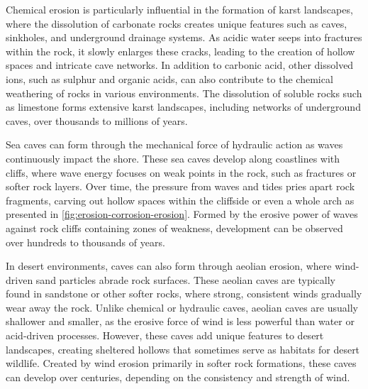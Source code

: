 Chemical erosion is particularly influential in the formation of karst landscapes, where the dissolution of carbonate rocks creates unique features such as caves, sinkholes, and underground drainage systems. As acidic water seeps into fractures within the rock, it slowly enlarges these cracks, leading to the creation of hollow spaces and intricate cave networks. In addition to carbonic acid, other dissolved ions, such as sulphur and organic acids, can also contribute to the chemical weathering of rocks in various environments. The dissolution of soluble rocks such as limestone forms extensive karst landscapes, including networks of underground caves, over thousands to millions of years.

Sea caves can form through the mechanical force of hydraulic action as waves continuously impact the shore. These sea caves develop along coastlines with cliffs, where wave energy focuses on weak points in the rock, such as fractures or softer rock layers. Over time, the pressure from waves and tides pries apart rock fragments, carving out hollow spaces within the cliffside or even a whole arch as presented in \cref{fig:erosion-corrosion-erosion}. Formed by the erosive power of waves against rock cliffs containing zones of weakness, development can be observed over hundreds to thousands of years.

In desert environments, caves can also form through aeolian erosion, where wind-driven sand particles abrade rock surfaces. These aeolian caves are typically found in sandstone or other softer rocks, where strong, consistent winds gradually wear away the rock. Unlike chemical or hydraulic caves, aeolian caves are usually shallower and smaller, as the erosive force of wind is less powerful than water or acid-driven processes. However, these caves add unique features to desert landscapes, creating sheltered hollows that sometimes serve as habitats for desert wildlife. Created by wind erosion primarily in softer rock formations, these caves can develop over centuries, depending on the consistency and strength of wind.

\smallConclusion

